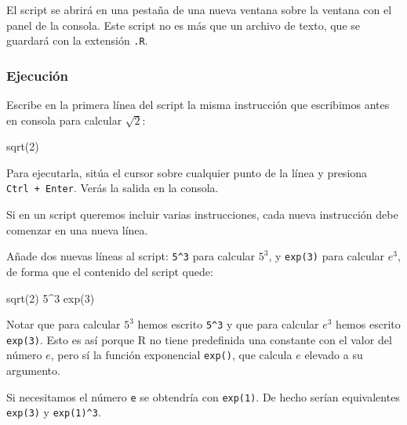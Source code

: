 \documentclass[
  title=normal,
  notoc,
  bib=normal]{mnye}
\newenvironment{Shaded}{\begin{snugshade}}{\end{snugshade}}
\newcommand{\NormalTok}[1]{#1}
\begin{document}
El script se abrirá en una pestaña de una nueva ventana sobre la ventana con el panel de la consola. Este script no es más que un archivo de texto, que se guardará con la extensión \texttt{.R}.

\hypertarget{ejecuciuxf3n}{%
\subsubsection{Ejecución}\label{ejecuciuxf3n}}

Escribe en la primera línea del script la misma instrucción que escribimos antes en consola para calcular \(\sqrt{2}\):

\begin{Shaded}
\begin{Highlighting}[]
\NormalTok{sqrt(2)}
\end{Highlighting}
\end{Shaded}

Para ejecutarla, sitúa el cursor sobre cualquier punto de la línea y presiona \texttt{Ctrl\ +\ Enter}. Verás la salida en la consola.

\href{https://drive.google.com/uc?id=1_vTsqbZS28gqPeWG2QVgblgRgojwRuUK&export=view}{\faVideoCamera}

Si en un script queremos incluir varias instrucciones, cada nueva instrucción debe comenzar en una nueva línea.

Añade dos nuevas líneas al script: \texttt{5\^{}3} para calcular \(5^3\), y \texttt{exp(3)} para calcular \(e^3\),
de forma que el contenido del script quede:

\begin{Shaded}
\begin{Highlighting}[]
\NormalTok{sqrt(2)}
\NormalTok{5\^{}3}
\NormalTok{exp(3)}
\end{Highlighting}
\end{Shaded}

\begin{infobox}
Notar que para calcular \(5^3\) hemos escrito
\texttt{5\^{}3} y que para calcular \(e^3\) hemos escrito \texttt{exp(3)}. Esto es así porque \textsf{R} no tiene predefinida una constante con el valor del número \(e\), pero sí la función exponencial \texttt{exp()}, que calcula \(e\) elevado a su argumento.

Si necesitamos el número \texttt{e} se obtendría con \texttt{exp(1)}. De hecho serían equivalentes \texttt{exp(3)} y \texttt{exp(1)\^{}3}.

\end{infobox}
\end{document}
